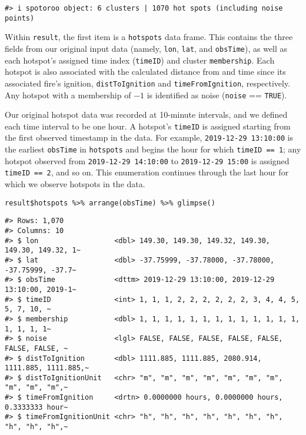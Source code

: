 \begin{verbatim}
#> i spotoroo object: 6 clusters | 1070 hot spots (including noise points)
\end{verbatim}

Within \texttt{result}, the first item is a \texttt{hotspots} data frame. This contains the three fields from our original input data (namely, \texttt{lon}, \texttt{lat}, and \texttt{obsTime}), as well as each hotspot's assigned time index (\texttt{timeID}) and cluster \texttt{membership}. Each hotspot is also associated with the calculated distance from and time since its associated fire's ignition, \texttt{distToIgnition} and \texttt{timeFromIgnition}, respectively. Any hotspot with a membership of \(-1\) is identified as noise (\texttt{noise} == \texttt{TRUE}).

Our original hotspot data was recorded at 10-minute intervals, and we defined each time interval to be one hour. A hotspot's \texttt{timeID} is assigned starting from the first observed timestamp in the data. For example, \texttt{2019-12-29\ 13:10:00} is the earliest \texttt{obsTime} in \texttt{hotspots} and begins the hour for which \texttt{timeID\ ==\ 1}; any hotspot observed from \texttt{2019-12-29\ 14:10:00} to \texttt{2019-12-29\ 15:00} is assigned \texttt{timeID\ ==\ 2}, and so on. This enumeration continues through the last hour for which we observe hotspots in the data.

\begin{verbatim}
result$hotspots %>% arrange(obsTime) %>% glimpse()
\end{verbatim}

\begin{verbatim}
#> Rows: 1,070
#> Columns: 10
#> $ lon                  <dbl> 149.30, 149.30, 149.32, 149.30, 149.30, 149.32, 1~
#> $ lat                  <dbl> -37.75999, -37.78000, -37.78000, -37.75999, -37.7~
#> $ obsTime              <dttm> 2019-12-29 13:10:00, 2019-12-29 13:10:00, 2019-1~
#> $ timeID               <int> 1, 1, 1, 2, 2, 2, 2, 2, 2, 3, 4, 4, 5, 5, 7, 10, ~
#> $ membership           <dbl> 1, 1, 1, 1, 1, 1, 1, 1, 1, 1, 1, 1, 1, 1, 1, 1, 1~
#> $ noise                <lgl> FALSE, FALSE, FALSE, FALSE, FALSE, FALSE, FALSE, ~
#> $ distToIgnition       <dbl> 1111.885, 1111.885, 2080.914, 1111.885, 1111.885,~
#> $ distToIgnitionUnit   <chr> "m", "m", "m", "m", "m", "m", "m", "m", "m", "m",~
#> $ timeFromIgnition     <drtn> 0.0000000 hours, 0.0000000 hours, 0.3333333 hour~
#> $ timeFromIgnitionUnit <chr> "h", "h", "h", "h", "h", "h", "h", "h", "h", "h",~
\end{verbatim}

